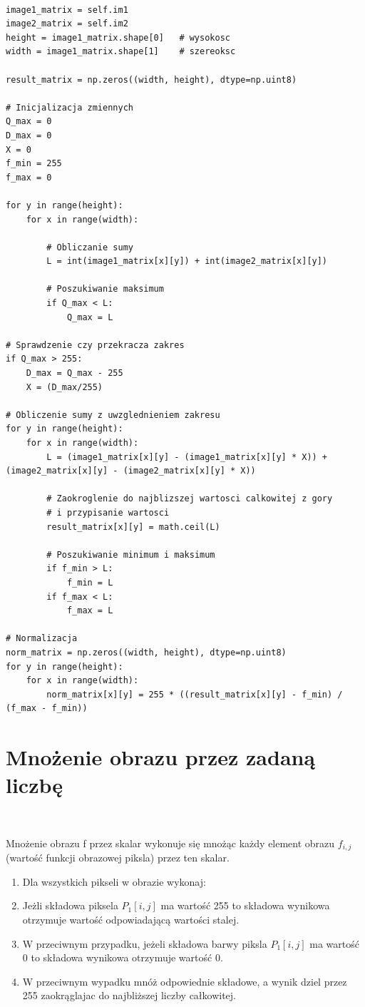 \documentclass[final,a4paper,openany,12pt]{mwbk}
\begin{document}
\begin{lstlisting}[caption=Sumowanie obrazów szarych]

image1_matrix = self.im1
image2_matrix = self.im2
height = image1_matrix.shape[0]   # wysokosc
width = image1_matrix.shape[1]    # szereoksc

result_matrix = np.zeros((width, height), dtype=np.uint8)

# Inicjalizacja zmiennych
Q_max = 0
D_max = 0
X = 0
f_min = 255
f_max = 0

for y in range(height):
    for x in range(width):  

        # Obliczanie sumy
        L = int(image1_matrix[x][y]) + int(image2_matrix[x][y])

        # Poszukiwanie maksimum
        if Q_max < L:
            Q_max = L

# Sprawdzenie czy przekracza zakres
if Q_max > 255:
    D_max = Q_max - 255
    X = (D_max/255)

# Obliczenie sumy z uwzglednieniem zakresu
for y in range(height):
    for x in range(width): 
        L = (image1_matrix[x][y] - (image1_matrix[x][y] * X)) + (image2_matrix[x][y] - (image2_matrix[x][y] * X))

        # Zaokroglenie do najblizszej wartosci calkowitej z gory
        # i przypisanie wartosci
        result_matrix[x][y] = math.ceil(L)
        
        # Poszukiwanie minimum i maksimum
        if f_min > L:
            f_min = L
        if f_max < L:
            f_max = L

# Normalizacja
norm_matrix = np.zeros((width, height), dtype=np.uint8)
for y in range(height):
    for x in range(width):
        norm_matrix[x][y] = 255 * ((result_matrix[x][y] - f_min) / (f_max - f_min))

\end{lstlisting}
\newpage

\section {Mnożenie obrazu przez zadaną liczbę}
\hfill\\
\indent

Mnożenie obrazu f przez skalar wykonuje się mnożąc każdy element obrazu $f_{i,j}$ (wartość funkcji obrazowej piksla) przez ten skalar.

\begin{enumerate}
		\item Dla wszystkich pikseli w obrazie wykonaj:
		\item Jeżli składowa piksela $P_{1}[i,j]$ ma wartość 255 to składowa wynikowa otrzymuje wartość odpowiadającą wartości stalej.
		\item W przeciwnym przypadku, jeżeli składowa barwy piksla $P_{1}[i,j]$ ma wartość 0 to składowa wynikowa otrzymuje wartość 0.
		\item W przeciwnym wypadku mnóż odpowiednie składowe, a wynik dziel przez 255 zaokrąglajac do najbliższej liczby całkowitej.
	\end{enumerate}
\end{document}
